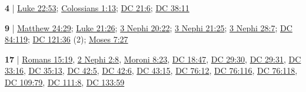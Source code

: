 	\begin{compactdesc}
	
		\item[power of darkness] \textbf{4} | \hyperref[LUKE-22-53]{Luke 22:53}; \hyperref[COLOSSIANS-1-13]{Colossians 1:13}; \hyperref[DC21-6]{DC 21:6}; \hyperref[DC38-11]{DC 38:11}
			\begin{compactdesc}
				\item[Bible anchor verses] \phantom{.}
					\begin{compactdesc}
						\item[Luke 22:53]
						\item[Colossians 1:13]
					\end{compactdesc}
			\end{compactdesc}
			
		\item[power of heaven] \textbf{9} | \hyperref[MATTHEW-24-29]{Matthew 24:29}; \hyperref[LUKE-21-26]{Luke 21:26}; \hyperref[3NEPHI-20-22]{3 Nephi 20:22}; \hyperref[3NEPHI-21-25]{3 Nephi 21:25}; \hyperref[3NEPHI-28-7]{3 Nephi 28:7}; \hyperref[DC84-119]{DC 84:119}; \hyperref[DC121-36]{DC 121:36} (2); \hyperref[MOSES-7-27]{Moses 7:27}
			\begin{compactdesc}
				\item[Bible anchor verses] \phantom{.}
					\begin{compactdesc}
						\item[Matthew 24:29]
						\item[Luke 21:26]
					\end{compactdesc}
			\end{compactdesc}
			
		\item[power of * spirit] \textbf{17} | \hyperref[ROMANS-15-19]{Romans 15:19}, \hyperref[2NEPHI-2-8]{2 Nephi 2:8}, \hyperref[MORONI-8-23]{Moroni 8:23}, \hyperref[DC18-47]{DC 18:47}, \hyperref[DC29-30]{DC 29:30}, \hyperref[DC29-31]{DC 29:31}, \hyperref[DC33-16]{DC 33:16}, \hyperref[DC35-13]{DC 35:13}, \hyperref[DC42-5]{DC 42:5}, \hyperref[DC42-6]{DC 42:6}, \hyperref[DC43-15]{DC 43:15}, \hyperref[DC76-12]{DC 76:12}, \hyperref[DC76-116]{DC 76:116}, \hyperref[DC76-118]{DC 76:118}, \hyperref[DC109-79]{DC 109:79}, \hyperref[DC111-8]{DC 111:8}, \hyperref[DC133-59]{DC 133:59}
			
	\end{compactdesc}
	
